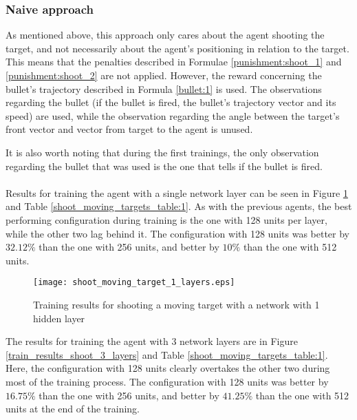 \subsubsection{Naive approach} \label{subsubsection:shoot_naive}

As mentioned above, this approach only cares about the agent shooting the target, and not necessarily about the agent's positioning in relation to the target. This means that the penalties described in Formulae \ref{punishment:shoot_1} and \ref{punishment:shoot_2} are not applied. However, the reward concerning the bullet's trajectory described in Formula \ref{bullet:1} is used. The observations regarding the bullet (if the bullet is fired, the bullet's trajectory vector and its speed) are used, while the observation regarding the angle between the target's front vector and vector from target to the agent is unused.

It is also worth noting that during the first trainings, the only observation regarding the bullet that was used is the one that tells if the bullet is fired.

\paragraph{}
Results for training the agent with a single network layer can be seen in Figure \ref{train_results_shoot_1_layers} and Table \ref{shoot_moving_targets_table:1}. As with the previous agents, the best performing configuration during training is the one with 128 units per layer, while the other two lag behind it. The configuration with 128 units was better by $32.12\%$ than the one with 256 units, and better by $10\%$ than the one with 512 units.

\begin{figure}
    \begin{center}
        \texttt{[image: shoot\_moving\_target\_1\_layers.eps]}
        \caption{Training results for shooting a moving target with a network with 1 hidden layer}
        \label{train_results_shoot_1_layers}
    \end{center}
\end{figure}

The results for training the agent with 3 network layers are in Figure \ref{train_results_shoot_3_layers} and Table \ref{shoot_moving_targets_table:1}. Here, the configuration with 128 units clearly overtakes the other two during most of the training process. The configuration with 128 units was better by $16.75\%$ than the one with 256 units, and better by $41.25\%$ than the one with 512 units at the end of the training.

